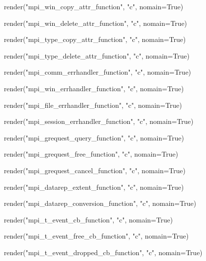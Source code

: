 \begin{mpi-binding}
    render("mpi_win_copy_attr_function", "c", nomain=True)
\end{mpi-binding}
\begin{mpi-binding}
    render("mpi_win_delete_attr_function", "c", nomain=True)
\end{mpi-binding}

\begin{mpi-binding}
    render("mpi_type_copy_attr_function", "c", nomain=True)
\end{mpi-binding}
\begin{mpi-binding}
    render("mpi_type_delete_attr_function", "c", nomain=True)
\end{mpi-binding}

\begin{mpi-binding}
    render("mpi_comm_errhandler_function", "c", nomain=True)
\end{mpi-binding}
\begin{mpi-binding}
    render("mpi_win_errhandler_function", "c", nomain=True)
\end{mpi-binding}
\begin{mpi-binding}
    render("mpi_file_errhandler_function", "c", nomain=True)
\end{mpi-binding}
\begin{mpi-binding}
    render("mpi_session_errhandler_function", "c", nomain=True)
\end{mpi-binding}

\begin{mpi-binding}
    render("mpi_grequest_query_function", "c", nomain=True)
\end{mpi-binding}
\begin{mpi-binding}
    render("mpi_grequest_free_function", "c", nomain=True)
\end{mpi-binding}
\begin{mpi-binding}
    render("mpi_grequest_cancel_function", "c", nomain=True)
\end{mpi-binding}

\begin{mpi-binding}
    render("mpi_datarep_extent_function", "c", nomain=True)
\end{mpi-binding}
\begin{mpi-binding}
    render("mpi_datarep_conversion_function", "c", nomain=True)
\end{mpi-binding}

\begin{mpi-binding}
    render("mpi_t_event_cb_function", "c", nomain=True)
\end{mpi-binding}
\begin{mpi-binding}
    render("mpi_t_event_free_cb_function", "c", nomain=True)
\end{mpi-binding}
\begin{mpi-binding}
    render("mpi_t_event_dropped_cb_function", "c", nomain=True)
\end{mpi-binding}

